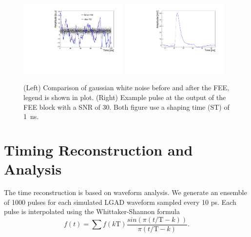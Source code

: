 \documentclass[preprint,1p]{elsarticle}
\begin{document}
\begin{figure}[htbp]
  \centering
  \includegraphics[width=0.48\textwidth]{figs/noise_vs_shaped_noise.pdf} \hfill
  \includegraphics[width=0.48\textwidth]{figs/lgad_pre_rad_st_1ns_snr_30.pdf}
  \caption{(Left) Comparison of gaussian white noise before and after the FEE, legend is shown in plot.
  (Right) Example pulse at the output of the FEE block with a SNR of 30. Both figure use a shaping time (ST) of 1~\si{ns}.}
  \label{fig:noise}
\end{figure}

\section{Timing Reconstruction and Analysis}\label{sec:timing_and_analysis}
The time reconstruction is based on waveform analysis. We generate an ensemble of 1000 pulses for each 
simulated LGAD waveform sampled every 10 ps.
Each pulse is interpolated using the Whittaker-Shannon formula~\cite{whittaker_1915,shannon_1935}
\begin{equation}\label{eq:WS}
  f(t) = \sum f(k\mathrm{T})\frac{sin(\pi(t/\mathrm{T} - k))}{\pi(t/\mathrm{T} - k)}.
\end{equation}
\end{document}
